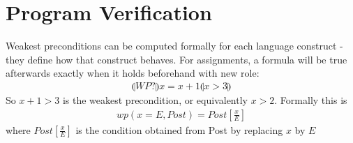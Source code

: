 \documentclass[a4paper]{article}
\theoremstyle{plain}
\theoremstyle{definition}
\newtheorem{defn}{Definition}[section]
\theoremstyle{remark}
\begin{document}
\section{Program Verification}
\begin{tcolorbox}[colback=black!3!white,colframe=black!60!white,title=\begin{defn}Weakest Precondition \label{Weakest Precondition}\end{defn}]
Weakest preconditions can be computed formally for each language construct - they define how that construct behaves. For assignments, a formula will be true afterwards exactly when it holds beforehand with new role:
\begin{align}
	\llparenthesis WP? \rrparenthesis x = x + 1 \llparenthesis x>3 \rrparenthesis
\end{align}
So $x+1>3$ is the weakest precondition, or equivalently $x>2$. Formally this is
\begin{align}
	wp(x=E,Post) = Post[\frac{x}{E}]
\end{align}
where $Post[\frac{x}{E}]$ is the condition obtained from Post by replacing $x$ by $E$
\end{tcolorbox}
\end{document}
